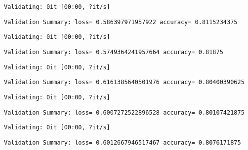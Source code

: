 \documentclass[11pt]{article}
\begin{document}
    
    \begin{Verbatim}[commandchars=\\\{\}]
Validating: 0it [00:00, ?it/s]
    \end{Verbatim}

    
    \begin{Verbatim}[commandchars=\\\{\}]
Validation Summary: loss= 0.586397971957922 accuracy= 0.8115234375
    \end{Verbatim}

    
    \begin{Verbatim}[commandchars=\\\{\}]
Validating: 0it [00:00, ?it/s]
    \end{Verbatim}

    
    \begin{Verbatim}[commandchars=\\\{\}]
Validation Summary: loss= 0.5749364241957664 accuracy= 0.81875
    \end{Verbatim}

    
    \begin{Verbatim}[commandchars=\\\{\}]
Validating: 0it [00:00, ?it/s]
    \end{Verbatim}

    
    \begin{Verbatim}[commandchars=\\\{\}]
Validation Summary: loss= 0.6161385640501976 accuracy= 0.80400390625
    \end{Verbatim}

    
    \begin{Verbatim}[commandchars=\\\{\}]
Validating: 0it [00:00, ?it/s]
    \end{Verbatim}

    
    \begin{Verbatim}[commandchars=\\\{\}]
Validation Summary: loss= 0.6007272522896528 accuracy= 0.80107421875
    \end{Verbatim}

    
    \begin{Verbatim}[commandchars=\\\{\}]
Validating: 0it [00:00, ?it/s]
    \end{Verbatim}

    
    \begin{Verbatim}[commandchars=\\\{\}]
Validation Summary: loss= 0.6012667946517467 accuracy= 0.8076171875
    \end{Verbatim}
\end{document}
